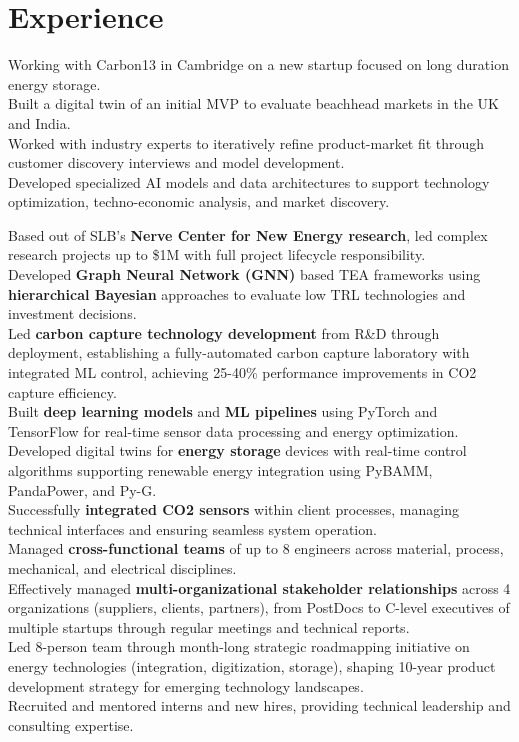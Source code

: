 \documentclass{../templates/karthicv-single}
\begin{document}
\maketitle

\section{Experience}
{Working with Carbon13 in Cambridge on a new startup focused on long duration energy storage.\\
Built a digital twin of an initial MVP to evaluate beachhead markets in the UK and India.\\
Worked with industry experts to iteratively refine product-market fit through customer discovery interviews and model development.\\
Developed specialized AI models and data architectures to support technology optimization, techno-economic analysis, and market discovery.}

{Based out of SLB's \textbf{Nerve Center for New Energy research}, led complex research projects up to \$1M with full project lifecycle responsibility. \\
Developed \textbf{Graph Neural Network (GNN)} based TEA frameworks using \textbf{hierarchical Bayesian} approaches to evaluate low TRL technologies and investment decisions. \\
Led \textbf{carbon capture technology development} from R\&D through deployment, establishing a fully-automated carbon capture laboratory with integrated ML control, achieving 25-40\% performance improvements in CO2 capture efficiency. \\
Built \textbf{deep learning models} and \textbf{ML pipelines} using PyTorch and TensorFlow for real-time sensor data processing and energy optimization. \\
Developed digital twins for \textbf{energy storage} devices with real-time control algorithms supporting renewable energy integration using PyBAMM, PandaPower, and Py-G. \\
Successfully \textbf{integrated CO2 sensors} within client processes, managing technical interfaces and ensuring seamless system operation. \\
Managed \textbf{cross-functional teams} of up to 8 engineers across material, process, mechanical, and electrical disciplines. \\
Effectively managed \textbf{multi-organizational stakeholder relationships} across 4 organizations (suppliers, clients, partners), from PostDocs to C-level executives of multiple startups through regular meetings and technical reports. \\
Led 8-person team through month-long strategic roadmapping initiative on energy technologies (integration, digitization, storage), shaping 10-year product development strategy for emerging technology landscapes. \\
Recruited and mentored interns and new hires, providing technical leadership and consulting expertise.}
\end{document}
